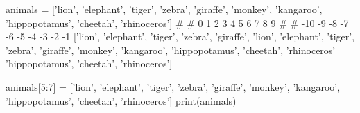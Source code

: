 animals = ['lion', 'elephant', 'tiger', 'zebra', 'giraffe', 'monkey', 'kangaroo', 'hippopotamus', 'cheetah', 'rhinoceros']
# #             0        1         2         3        4         5           6          7                 8         9
# #             -10      -9        -8       -7        -6        -5         -4          -3             -2          -1
['lion', 'elephant', 'tiger', 'zebra', 'giraffe', 'lion', 'elephant', 'tiger', 'zebra', 'giraffe', 'monkey', 'kangaroo', 'hippopotamus', 'cheetah', 'rhinoceros' 'hippopotamus', 'cheetah', 'rhinoceros']

animals[5:7] = ['lion', 'elephant', 'tiger', 'zebra', 'giraffe', 'monkey', 'kangaroo', 'hippopotamus', 'cheetah', 'rhinoceros']
print(animals)



